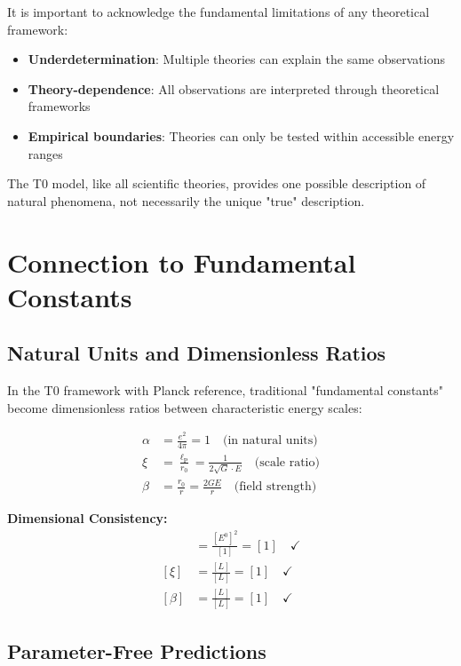 \documentclass[12pt,a4paper]{report}
\newcommand{\lP}{\ell_{\text{P}}}         %
\newcommand{\rzero}{r_0}                  %
\newcommand{\alphafine}{\alpha}          %
\begin{document}
	It is important to acknowledge the fundamental limitations of any theoretical framework:
	
	\begin{itemize}
		\item \textbf{Underdetermination}: Multiple theories can explain the same observations
		\item \textbf{Theory-dependence}: All observations are interpreted through theoretical frameworks
		\item \textbf{Empirical boundaries}: Theories can only be tested within accessible energy ranges
	\end{itemize}
	
	The T0 model, like all scientific theories, provides one possible description of natural phenomena, not necessarily the unique "true" description.
	
	\section{Connection to Fundamental Constants}\label{sec:fundamental_constants}
	
	\subsection{Natural Units and Dimensionless Ratios}\label{subsec:natural_units_ratios}
	
	In the T0 framework with Planck reference, traditional "fundamental constants" become dimensionless ratios between characteristic energy scales:
	
	\begin{align}
		\alphafine &= \frac{e^2}{4\pi} = 1 \quad \text{(in natural units)} \\
		\xi &= \frac{\lP}{\rzero} = \frac{1}{2\sqrt{G} \cdot E} \quad \text{(scale ratio)} \\
		\beta &= \frac{\rzero}{r} = \frac{2GE}{r} \quad \text{(field strength)}
	\end{align}
	
	\textbf{Dimensional Consistency:}
	\begin{align}
		[\alphafine] &= \frac{[E^0]^2}{[1]} = [1] \quad \checkmark \\
		[\xi] &= \frac{[L]}{[L]} = [1] \quad \checkmark \\
		[\beta] &= \frac{[L]}{[L]} = [1] \quad \checkmark
	\end{align}
	
	\subsection{Parameter-Free Predictions}\label{subsec:parameter_free_predictions}
	
\end{document}
